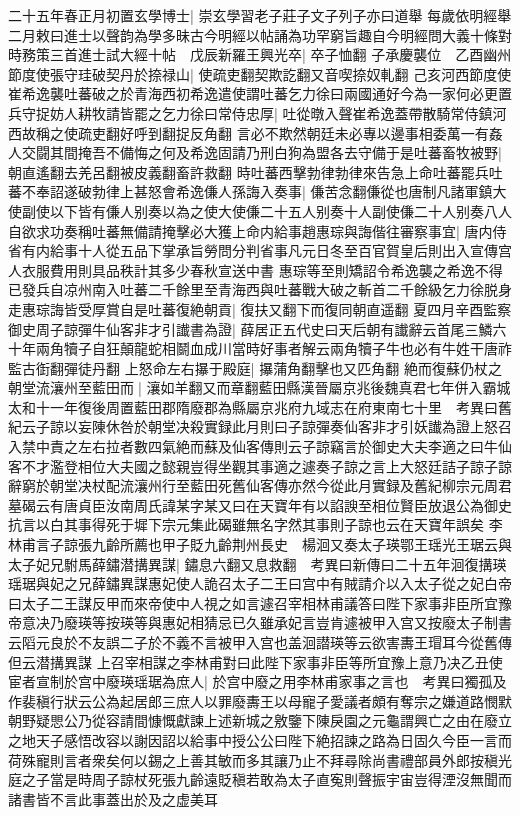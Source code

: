 二十五年春正月初置玄學博士|{
	崇玄學習老子莊子文子列子亦曰道舉}
每歲依明經舉　二月敕曰進士以聲韵為學多昧古今明經以帖誦為功罕窮旨趣自今明經問大義十條對時務策三首進士試大經十帖　戊辰新羅王興光卒|{
	卒子恤翻}
子承慶襲位　乙酉幽州節度使張守珪破契丹於捺禄山|{
	使疏吏翻契欺訖翻又音喫捺奴軋翻}
己亥河西節度使崔希逸襲吐蕃破之於青海西初希逸遣使謂吐蕃乞力徐曰兩國通好今為一家何必更置兵守捉妨人耕牧請皆罷之乞力徐曰常侍忠厚|{
	吐從暾入聲崔希逸蓋帶散騎常侍鎮河西故稱之使疏吏翻好呼到翻捉反角翻}
言必不欺然朝廷未必專以邊事相委萬一有姦人交闘其間掩吾不備悔之何及希逸固請乃刑白狗為盟各去守備于是吐蕃畜牧被野|{
	朝直遙翻去羌呂翻被皮義翻畜許救翻}
時吐蕃西擊勃律勃律來告急上命吐蕃罷兵吐蕃不奉詔遂破勃律上甚怒會希逸傔人孫誨入奏事|{
	傔苦念翻傔從也唐制凡諸軍鎮大使副使以下皆有傔人别奏以為之使大使傔二十五人别奏十人副使傔二十人别奏八人}
自欲求功奏稱吐蕃無備請掩擊必大獲上命内給事趙惠琮與誨偕往審察事宜|{
	唐内侍省有内給事十人從五品下掌承旨勞問分判省事凡元日冬至百官賀皇后則出入宣傳宫人衣服費用則具品秩計其多少春秋宣送中書}
惠琮等至則矯詔令希逸襲之希逸不得已發兵自凉州南入吐蕃二千餘里至青海西與吐蕃戰大破之斬首二千餘級乞力徐脱身走惠琮誨皆受厚賞自是吐蕃復絶朝貢|{
	復扶又翻下而復同朝直遥翻}
夏四月辛酉監察御史周子諒彈牛仙客非才引䜟書為證|{
	薛居正五代史曰天后朝有䜟辭云首尾三鱗六十年兩角犢子自狂顛龍蛇相鬬血成川當時好事者解云兩角犢子牛也必有牛姓干唐祚監古衘翻彈徒丹翻}
上怒命左右㩧于殿庭|{
	㩧蒲角翻擊也又匹角翻}
絶而復蘇仍杖之朝堂流瀼州至藍田而|{
	瀼如羊翻又而章翻藍田縣漢晉屬京兆後魏真君七年併入霸城太和十一年復後周置藍田郡隋廢郡為縣屬京兆府九域志在府東南七十里　考異曰舊紀云子諒以妄陳休咎於朝堂决殺實録此月則曰子諒彈奏仙客非才引妖䜟為證上怒召入禁中責之左右拉者數四氣絶而蘇及仙客傳則云子諒竊言於御史大夫李適之曰牛仙客不才濫登相位大夫國之懿親豈得坐觀其事適之遽奏子諒之言上大怒廷詰子諒子諒辭窮於朝堂决杖配流瀼州行至藍田死舊仙客傳亦然今從此月實録及舊紀柳宗元周君墓碣云有唐貞臣汝南周氏諱某字某又曰在天寶年有以諂諛至相位賢臣放退公為御史抗言以白其事得死于墀下宗元集此碣雖無名字然其事則子諒也云在天寶年誤矣}
李林甫言子諒張九齡所薦也甲子貶九齡荆州長史　楊洄又奏太子瑛鄂王瑶光王琚云與太子妃兄駙馬薛鏽潜搆異謀|{
	鏽息六翻又息救翻　考異曰新傳曰二十五年洄復搆瑛瑶琚與妃之兄薛鏽異謀惠妃使人詭召太子二王曰宫中有賊請介以入太子從之妃白帝曰太子二王謀反甲而來帝使中人視之如言遽召宰相林甫議答曰陛下家事非臣所宜豫帝意决乃廢瑛等按瑛等與惠妃相猜忌已久雖承妃言豈肯遽被甲入宫又按廢太子制書云䧟元良於不友誤二子於不義不言被甲入宫也盖洄譛瑛等云欲害夀王瑁耳今從舊傳但云潜搆異謀}
上召宰相謀之李林甫對曰此陛下家事非臣等所宜豫上意乃决乙丑使宦者宣制於宫中廢瑛瑶琚為庶人|{
	於宫中廢之用李林甫家事之言也　考異曰獨孤及作裴稹行狀云公為起居郎三庶人以罪廢夀王以母寵子愛議者頗有奪宗之嫌道路憫默朝野疑愳公乃從容請間慷慨獻諫上述新城之敫鑒下陳戾園之元龜謂興亡之由在廢立之地天子感悟改容以謝因詔以給事中授公公曰陛下絶招諫之路為日固久今臣一言而荷殊寵則言者衆矣何以錫之上善其敏而多其讓乃止不拜尋除尚書禮部員外郎按稹光庭之子當是時周子諒杖死張九齡遠貶稹若敢為太子直寃則聲振宇宙豈得湮沒無聞而諸書皆不言此事蓋出於及之虚美耳}
